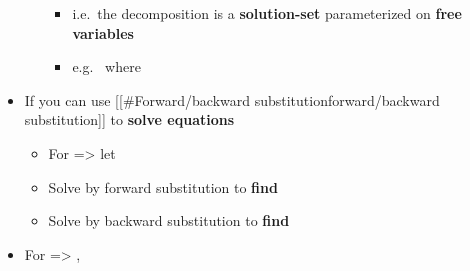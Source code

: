 \begin{itemize}
\begin{itemize}
\begin{itemize}
                  \item
                        i.e.~the decomposition is a \textbf{solution-set} parameterized on
                        \textbf{free variables}
                  \item
                        e.g.~
                        where
                \end{itemize}
        \end{itemize}
  \item
        If  you can use {[}{[}\#Forward/backward
        substitution\textbar forward/backward substitution{]}{]} to
        \textbf{solve equations}

        \begin{itemize}

          \item
                For  =\textgreater{} let 
          \item
                Solve  by forward substitution to \textbf{find
                  }
          \item
                Solve  by backward substitution to \textbf{find
                  }
        \end{itemize}
  \item
        For  =\textgreater{}
        ,
\end{itemize}

